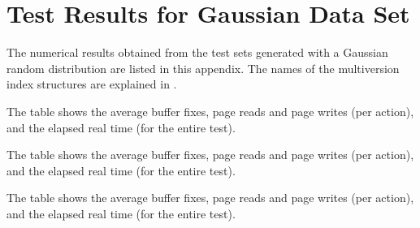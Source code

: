 \chapter{Test Results for Gaussian Data Set}
\label{appendix:test-results-gaussian}

The numerical results obtained from the test sets generated with a Gaussian
random distribution are listed in this appendix.
The names of the multiversion index structures are explained in
.

\begin{table}[htb]
\begin{center}

\caption{Names of the database index structures.}
\label{table:test-database-names-gaussian}
\end{center}
\end{table}

\clearpage

\begin{table}[htb]
\begin{center}

{The table shows the average buffer fixes, page reads and page writes (per
action), and the elapsed real time (for the entire test).}
\label{table:qu-initial-5-summary-gaussian}
\end{center}
\end{table}

\begin{table}[htb]
\begin{center}

{The table shows the average buffer fixes, page reads and page writes (per
action), and the elapsed real time (for the entire test).}
\label{table:qu-initial-100-summary-gaussian}
\end{center}
\end{table}


\begin{table}[htb]
\begin{center}

% 
{The table shows the average buffer fixes, page reads and page writes (per
action), and the elapsed real time (for the entire test).}
\label{table:qu-del-50-5-summary-gaussian}
\end{center}
\end{table}

